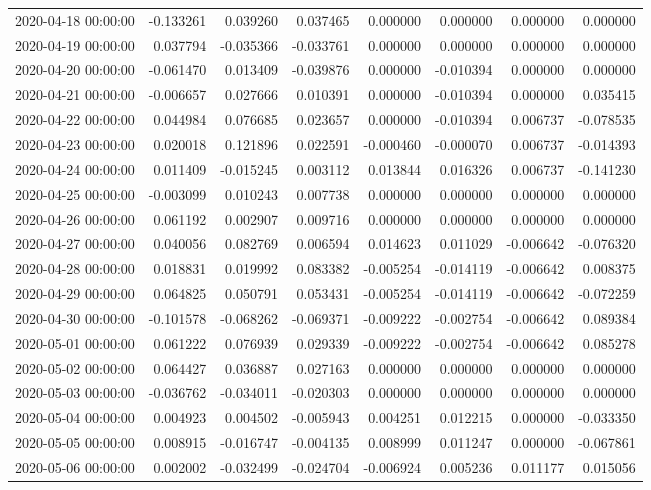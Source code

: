\begin{tabular}{lrrrrrrr}
2020-04-18 00:00:00 & -0.133261 & 0.039260 & 0.037465 & 0.000000 & 0.000000 & 0.000000 & 0.000000 \\
2020-04-19 00:00:00 & 0.037794 & -0.035366 & -0.033761 & 0.000000 & 0.000000 & 0.000000 & 0.000000 \\
2020-04-20 00:00:00 & -0.061470 & 0.013409 & -0.039876 & 0.000000 & -0.010394 & 0.000000 & 0.000000 \\
2020-04-21 00:00:00 & -0.006657 & 0.027666 & 0.010391 & 0.000000 & -0.010394 & 0.000000 & 0.035415 \\
2020-04-22 00:00:00 & 0.044984 & 0.076685 & 0.023657 & 0.000000 & -0.010394 & 0.006737 & -0.078535 \\
2020-04-23 00:00:00 & 0.020018 & 0.121896 & 0.022591 & -0.000460 & -0.000070 & 0.006737 & -0.014393 \\
2020-04-24 00:00:00 & 0.011409 & -0.015245 & 0.003112 & 0.013844 & 0.016326 & 0.006737 & -0.141230 \\
2020-04-25 00:00:00 & -0.003099 & 0.010243 & 0.007738 & 0.000000 & 0.000000 & 0.000000 & 0.000000 \\
2020-04-26 00:00:00 & 0.061192 & 0.002907 & 0.009716 & 0.000000 & 0.000000 & 0.000000 & 0.000000 \\
2020-04-27 00:00:00 & 0.040056 & 0.082769 & 0.006594 & 0.014623 & 0.011029 & -0.006642 & -0.076320 \\
2020-04-28 00:00:00 & 0.018831 & 0.019992 & 0.083382 & -0.005254 & -0.014119 & -0.006642 & 0.008375 \\
2020-04-29 00:00:00 & 0.064825 & 0.050791 & 0.053431 & -0.005254 & -0.014119 & -0.006642 & -0.072259 \\
2020-04-30 00:00:00 & -0.101578 & -0.068262 & -0.069371 & -0.009222 & -0.002754 & -0.006642 & 0.089384 \\
2020-05-01 00:00:00 & 0.061222 & 0.076939 & 0.029339 & -0.009222 & -0.002754 & -0.006642 & 0.085278 \\
2020-05-02 00:00:00 & 0.064427 & 0.036887 & 0.027163 & 0.000000 & 0.000000 & 0.000000 & 0.000000 \\
2020-05-03 00:00:00 & -0.036762 & -0.034011 & -0.020303 & 0.000000 & 0.000000 & 0.000000 & 0.000000 \\
2020-05-04 00:00:00 & 0.004923 & 0.004502 & -0.005943 & 0.004251 & 0.012215 & 0.000000 & -0.033350 \\
2020-05-05 00:00:00 & 0.008915 & -0.016747 & -0.004135 & 0.008999 & 0.011247 & 0.000000 & -0.067861 \\
2020-05-06 00:00:00 & 0.002002 & -0.032499 & -0.024704 & -0.006924 & 0.005236 & 0.011177 & 0.015056 \\

\end{tabular}
